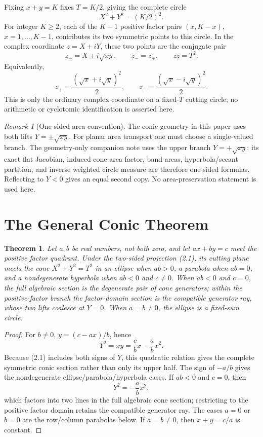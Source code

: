 \documentclass[11pt]{amsart}
\newtheorem{theorem}{Theorem}[section]
\theoremstyle{remark}
\newtheorem*{remark}{Remark}
\begin{document}
Fixing $x+y=K$ fixes $T=K/2$, giving the complete circle
\[
X^2+Y^2=(K/2)^2.
\]
For integer $K\ge2$, each of the $K-1$ positive factor pairs $(x,K-x)$, $x=1,\ldots,K-1$, contributes its two symmetric points to this circle. In the complex coordinate $z=X+iY$, these two points are the conjugate pair
\[
z_\pm=X\pm i\sqrt{xy},\qquad z_-=\overline{z_+},\qquad z\overline z=T^2.
\]
Equivalently,
\[
z_+=\frac{(\sqrt{x}+i\sqrt{y})^2}{2},\qquad z_-=\frac{(\sqrt{x}-i\sqrt{y})^2}{2}.
\]
This is only the ordinary complex coordinate on a fixed-$T$ cutting circle; no arithmetic or cyclotomic identification is asserted here.

\begin{remark}[One-sided area convention]
The conic geometry in this paper uses both lifts $Y=\pm\sqrt{xy}$. For planar area transport one must choose a single-valued branch. The geometry-only companion note \cite{Ebert2026Area} uses the upper branch $Y=+\sqrt{xy}$; its exact flat Jacobian, induced cone-area factor, band areas, hyperbola/secant partition, and inverse weighted circle measure are therefore one-sided formulas. Reflecting to $Y<0$ gives an equal second copy. No area-preservation statement is used here.
\end{remark}

\section{The General Conic Theorem}
\begin{theorem}\label{thm:conic}
Let $a,b$ be real numbers, not both zero, and let $ax+by=c$ meet the positive factor quadrant. Under the two-sided projection (2.1), its cutting plane meets the cone $X^2+Y^2=T^2$ in an ellipse when $ab>0$, a parabola when $ab=0$, and a nondegenerate hyperbola when $ab<0$ and $c\ne0$. When $ab<0$ and $c=0$, the full algebraic section is the degenerate pair of cone generators; within the positive-factor branch the factor-domain section is the compatible generator ray, whose two lifts coalesce at $Y=0$. When $a=b\ne0$, the ellipse is a fixed-sum circle.
\end{theorem}
\begin{proof}
For $b\ne0$, $y=(c-ax)/b$, hence
\[
Y^2=xy=\frac cbx-\frac abx^2.
\]
Because (2.1) includes both signs of $Y$, this quadratic relation gives the complete symmetric conic section rather than only its upper half. The sign of $-a/b$ gives the nondegenerate ellipse/parabola/hyperbola cases. If $ab<0$ and $c=0$, then
\[
Y^2=-\frac ab x^2,
\]
which factors into two lines in the full algebraic cone section; restricting to the positive factor domain retains the compatible generator ray. The cases $a=0$ or $b=0$ are the row/column parabolas below. If $a=b\ne0$, then $x+y=c/a$ is constant.
\end{proof}
\end{document}
